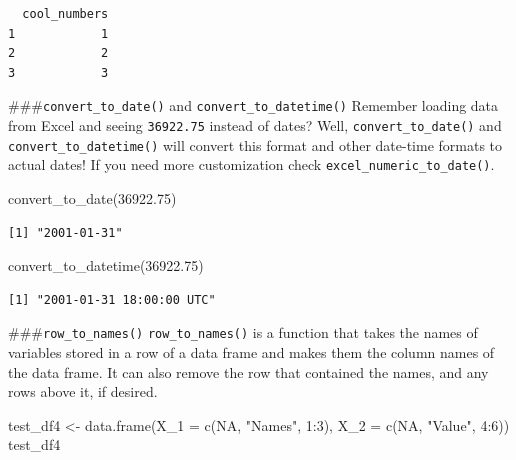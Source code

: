 \documentclass[
  letterpaper,
]{book}
\newenvironment{Shaded}{\begin{snugshade}}{\end{snugshade}}
\newcommand{\AttributeTok}[1]{\textcolor[rgb]{0.40,0.45,0.13}{#1}}
\newcommand{\ConstantTok}[1]{\textcolor[rgb]{0.56,0.35,0.01}{#1}}
\newcommand{\DecValTok}[1]{\textcolor[rgb]{0.68,0.00,0.00}{#1}}
\newcommand{\FloatTok}[1]{\textcolor[rgb]{0.68,0.00,0.00}{#1}}
\newcommand{\FunctionTok}[1]{\textcolor[rgb]{0.28,0.35,0.67}{#1}}
\newcommand{\NormalTok}[1]{\textcolor[rgb]{0.00,0.23,0.31}{#1}}
\newcommand{\OtherTok}[1]{\textcolor[rgb]{0.00,0.23,0.31}{#1}}
\newcommand{\SpecialCharTok}[1]{\textcolor[rgb]{0.37,0.37,0.37}{#1}}
\newcommand{\StringTok}[1]{\textcolor[rgb]{0.13,0.47,0.30}{#1}}
\begin{document}
\begin{verbatim}
  cool_numbers
1            1
2            2
3            3
\end{verbatim}

\#\#\#\texttt{convert\_to\_date()} and \texttt{convert\_to\_datetime()}
Remember loading data from Excel and seeing \texttt{36922.75} instead of
dates? Well, \texttt{convert\_to\_date()} and
\texttt{convert\_to\_datetime()} will convert this format and other
date-time formats to actual dates! If you need more customization check
\texttt{excel\_numeric\_to\_date()}.

\begin{Shaded}
\begin{Highlighting}[]
\FunctionTok{convert\_to\_date}\NormalTok{(}\FloatTok{36922.75}\NormalTok{)}
\end{Highlighting}
\end{Shaded}

\begin{verbatim}
[1] "2001-01-31"
\end{verbatim}

\begin{Shaded}
\begin{Highlighting}[]
\FunctionTok{convert\_to\_datetime}\NormalTok{(}\FloatTok{36922.75}\NormalTok{)}
\end{Highlighting}
\end{Shaded}

\begin{verbatim}
[1] "2001-01-31 18:00:00 UTC"
\end{verbatim}

\#\#\#\texttt{row\_to\_names()} \texttt{row\_to\_names()} is a function
that takes the names of variables stored in a row of a data frame and
makes them the column names of the data frame. It can also remove the
row that contained the names, and any rows above it, if desired.

\begin{Shaded}
\begin{Highlighting}[]
\NormalTok{test\_df4 }\OtherTok{\textless{}{-}} \FunctionTok{data.frame}\NormalTok{(}\AttributeTok{X\_1 =} \FunctionTok{c}\NormalTok{(}\ConstantTok{NA}\NormalTok{, }\StringTok{"Names"}\NormalTok{, }\DecValTok{1}\SpecialCharTok{:}\DecValTok{3}\NormalTok{),}
                   \AttributeTok{X\_2 =} \FunctionTok{c}\NormalTok{(}\ConstantTok{NA}\NormalTok{, }\StringTok{"Value"}\NormalTok{, }\DecValTok{4}\SpecialCharTok{:}\DecValTok{6}\NormalTok{))}
\NormalTok{test\_df4}
\end{Highlighting}
\end{Shaded}
\end{document}
